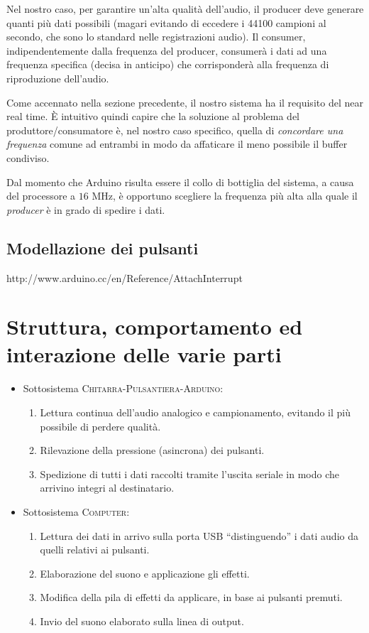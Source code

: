 \documentclass[a4paper,11pt]{article}
\begin{document}
Nel nostro caso, per garantire un'alta qualità dell'audio, il producer deve generare quanti più dati possibili (magari evitando di eccedere i \num{44100} campioni al secondo, che sono lo standard nelle registrazioni audio). Il consumer, indipendentemente dalla frequenza del producer, consumerà i dati ad una frequenza specifica (decisa in anticipo) che corrisponderà alla frequenza di riproduzione dell'audio.

Come accennato nella sezione precedente, il nostro sistema ha il requisito del near real time. È intuitivo quindi capire che la soluzione al problema del produttore/consumatore è, nel nostro caso specifico, quella di \textit{concordare una frequenza} comune ad entrambi in modo da affaticare il meno possibile il buffer condiviso.

Dal momento che Arduino risulta essere il collo di bottiglia del sistema, a causa del processore a $16$ MHz, è opportuno scegliere la frequenza più alta alla quale il \textit{producer} è in grado di spedire i dati.

\subsection{Modellazione dei pulsanti}



http://www.arduino.cc/en/Reference/AttachInterrupt

\section{Struttura, comportamento ed interazione delle varie parti}

\begin{itemize}
    \item Sottosistema \textsc{Chitarra-Pulsantiera-Arduino}:
    \begin{enumerate}
        \item Lettura continua dell'audio analogico e campionamento, evitando il più possibile di perdere qualità.
        \item Rilevazione della pressione (asincrona) dei pulsanti.
        \item Spedizione di tutti i dati raccolti tramite l'uscita seriale in modo che arrivino integri al destinatario.
    \end{enumerate}
    \item Sottosistema \textsc{Computer}:
    \begin{enumerate}
        \item Lettura dei dati in arrivo sulla porta USB ``distinguendo'' i dati audio da quelli relativi ai pulsanti.
        \item Elaborazione del suono e applicazione gli effetti.
        \item Modifica della pila di effetti da applicare, in base ai pulsanti premuti.
        \item Invio del suono elaborato sulla linea di output.
    \end{enumerate}
\end{itemize}
\end{document}
